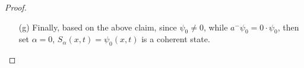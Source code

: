 \documentclass{article}
\begin{document}
\begin{proof}
\begin{itemize}
        So, regardless of the time $t\in\RR$, since $\alpha(t)=\alpha e^{-iwt}$ is a nonzero complex number independent of $x$, it implies $S_\alpha(x,t)$ remains as an eigenvector of $a^-$, and at each time $t\in\RR$ with corresponding eigenvalue $\alpha e^{-iwt}$, so it stays coherent.
        
        Also, notice that the proof in part (a),(b),(c) only requires $\alpha$ to be a complex number (since regardless of $\alpha=u+iv$, the inequality in part (c) always holds, as long as $S_\alpha(x,t)\neq 0$), hence as long as $S_\alpha(x,t)$ itself is a normalizable state that's an eigenvector of $\alpha^-$, regardless of its eigenvalue $\alpha$ corresponding to $\alpha^-$, it still saturates Uncertainty Principle.

        \hfil

        \item[(g)] Finally, based on the above claim, since $\psi_0\neq 0$, while $a^-\psi_0 = 0\cdot\psi_0$, then set $\alpha=0$, $S_\alpha(x,t)=\psi_0(x,t)$ is a coherent state.
    \end{itemize}
\end{proof}

\newpage
\end{document}
